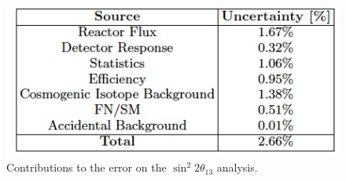 \begin{figure} 
\includegraphics[width = .5 \textwidth]{DC_Results/Fit_Errors}
\caption{Contributions to the error on the $\sin^2 2 \theta_{13}$ analysis.}
\label{Fit Error}
\end{figure}
 